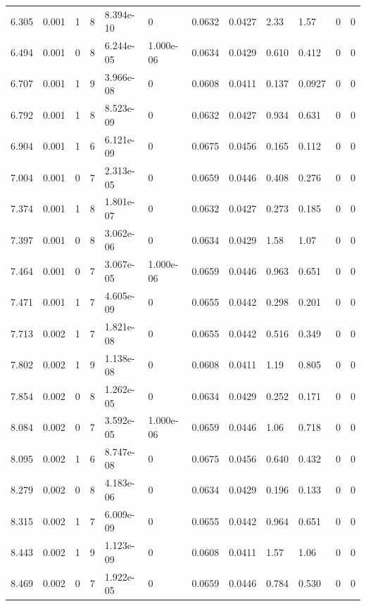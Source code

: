 \documentclass[preview]{standalone}
\begin{document}
{{{\begin{tabular}{L{1.2cm}C{1.2cm} C{0.3cm}C{0.5cm} C{1.4cm}C{1.4cm} C{1.4cm}C{1.4cm} C{1.6cm}C{1.6cm} C{1.6cm}C{1.6cm}}
  6.305  &  0.001  & 1     &  8 &  8.394e-10  & 0  &  0.0632&   0.0427& 2.33 & 1.57   &  0 & 0  \\ 
  6.494  &  0.001  & 0     &  8 &  6.244e-05  & 1.000e-06  &  0.0634&   0.0429& 0.610 & 0.412   &  0 & 0  \\ 
  6.707  &  0.001  & 1     &  9 &  3.966e-08  & 0  &  0.0608&   0.0411& 0.137 & 0.0927   &  0 & 0  \\ 
  6.792  &  0.001  & 1     &  8 &  8.523e-09  & 0  &  0.0632&   0.0427& 0.934 & 0.631   &  0 & 0  \\ 
  6.904  &  0.001  & 1     &  6 &  6.121e-09  & 0  &  0.0675&   0.0456& 0.165 & 0.112   &  0 & 0  \\ 
  7.004  &  0.001  & 0     &  7 &  2.313e-05  & 0  &  0.0659&   0.0446& 0.408 & 0.276   &  0 & 0  \\ 
  7.374  &  0.001  & 1     &  8 &  1.801e-07  & 0  &  0.0632&   0.0427& 0.273 & 0.185   &  0 & 0  \\ 
  7.397  &  0.001  & 0     &  8 &  3.062e-06  & 0  &  0.0634&   0.0429& 1.58 & 1.07   &  0 & 0  \\ 
  7.464  &  0.001  & 0     &  7 &  3.067e-05  & 1.000e-06  &  0.0659&   0.0446& 0.963 & 0.651   &  0 & 0  \\ 
  7.471  &  0.001  & 1     &  7 &  4.605e-09  & 0  &  0.0655&   0.0442& 0.298 & 0.201   &  0 & 0  \\ 
  7.713  &  0.002  & 1     &  7 &  1.821e-08  & 0  &  0.0655&   0.0442& 0.516 & 0.349   &  0 & 0  \\ 
  7.802  &  0.002  & 1     &  9 &  1.138e-08  & 0  &  0.0608&   0.0411& 1.19 & 0.805   &  0 & 0  \\ 
  7.854  &  0.002  & 0     &  8 &  1.262e-05  & 0  &  0.0634&   0.0429& 0.252 & 0.171   &  0 & 0  \\ 
  8.084  &  0.002  & 0     &  7 &  3.592e-05  & 1.000e-06  &  0.0659&   0.0446& 1.06 & 0.718   &  0 & 0  \\ 
  8.095  &  0.002  & 1     &  6 &  8.747e-08  & 0  &  0.0675&   0.0456& 0.640 & 0.432   &  0 & 0  \\ 
  8.279  &  0.002  & 0     &  8 &  4.183e-06  & 0  &  0.0634&   0.0429& 0.196 & 0.133   &  0 & 0  \\ 
  8.315  &  0.002  & 1     &  7 &  6.009e-09  & 0  &  0.0655&   0.0442& 0.964 & 0.651   &  0 & 0  \\ 
  8.443  &  0.002  & 1     &  9 &  1.123e-09  & 0  &  0.0608&   0.0411& 1.57 & 1.06   &  0 & 0  \\ 
  8.469  &  0.002  & 0     &  7 &  1.922e-05  & 0  &  0.0659&   0.0446& 0.784 & 0.530   &  0 & 0  \\ 

\end{tabular}}}}
\end{document}
